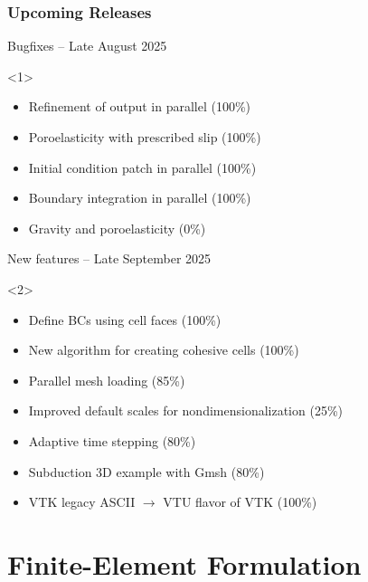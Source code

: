 \documentclass[aspectratio=169]{beamer}
\begin{document}
\begin{frame}
  \frametitle{Upcoming Releases}
  \summary{}

  \begin{itemize}
     Bugfixes -- Late August 2025
    \begin{onlyenv}<1>
      \begin{itemize}
      \item Refinement of output in parallel (100\%)
      \item Poroelasticity with prescribed slip (100\%)
      \item Initial condition patch in parallel (100\%)
      \item Boundary integration in parallel (100\%)
      \item Gravity and poroelasticity (0\%)
      \end{itemize}
    \end{onlyenv}
     New features -- Late September 2025
    \begin{onlyenv}<2>
      \begin{itemize}
      \item Define BCs using cell faces (100\%)
      \item New algorithm for creating cohesive cells (100\%)
      \item Parallel mesh loading (85\%)
      \item Improved default scales for nondimensionalization (25\%)
      \item Adaptive time stepping (80\%)
      \item Subduction 3D example with Gmsh (80\%)
      \item VTK legacy ASCII $\rightarrow$ VTU flavor of VTK (100\%)
      \end{itemize}
    \end{onlyenv}
  \end{itemize}
  
\end{frame}


\section{Finite-Element Formulation}

\abovedisplayskip=2pt
\abovedisplayshortskip=2pt
\belowdisplayskip=2pt
\belowdisplayshortskip=2pt
\end{document}
